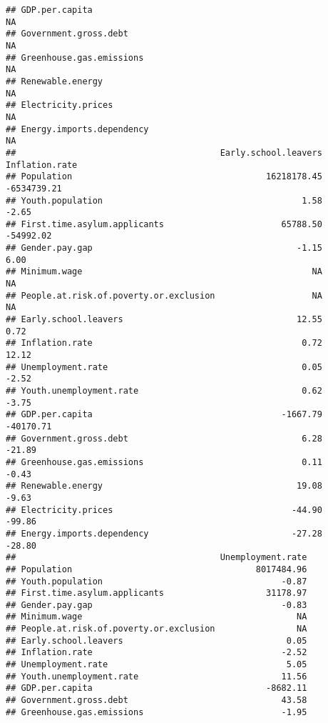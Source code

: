 \documentclass[
]{article}
\begin{document}
\begin{verbatim}
## GDP.per.capita                                                             NA
## Government.gross.debt                                                      NA
## Greenhouse.gas.emissions                                                   NA
## Renewable.energy                                                           NA
## Electricity.prices                                                         NA
## Energy.imports.dependency                                                  NA
##                                        Early.school.leavers Inflation.rate
## Population                                      16218178.45    -6534739.21
## Youth.population                                       1.58          -2.65
## First.time.asylum.applicants                       65788.50      -54992.02
## Gender.pay.gap                                        -1.15           6.00
## Minimum.wage                                             NA             NA
## People.at.risk.of.poverty.or.exclusion                   NA             NA
## Early.school.leavers                                  12.55           0.72
## Inflation.rate                                         0.72          12.12
## Unemployment.rate                                      0.05          -2.52
## Youth.unemployment.rate                                0.62          -3.75
## GDP.per.capita                                     -1667.79      -40170.71
## Government.gross.debt                                  6.28         -21.89
## Greenhouse.gas.emissions                               0.11          -0.43
## Renewable.energy                                      19.08          -9.63
## Electricity.prices                                   -44.90         -99.86
## Energy.imports.dependency                            -27.28         -28.80
##                                        Unemployment.rate
## Population                                    8017484.96
## Youth.population                                   -0.87
## First.time.asylum.applicants                    31178.97
## Gender.pay.gap                                     -0.83
## Minimum.wage                                          NA
## People.at.risk.of.poverty.or.exclusion                NA
## Early.school.leavers                                0.05
## Inflation.rate                                     -2.52
## Unemployment.rate                                   5.05
## Youth.unemployment.rate                            11.56
## GDP.per.capita                                  -8682.11
## Government.gross.debt                              43.58
## Greenhouse.gas.emissions                           -1.95

\end{verbatim}
\end{document}
